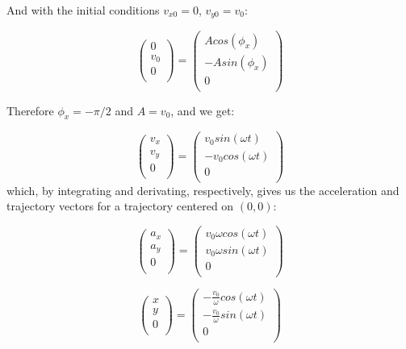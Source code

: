 \documentclass[a4paper,12pt,twoside]{article}
\begin{document}
And with the initial conditions $v_{x0}=0$, $v_{y0}=v_0$:

\begin{equation*}
	\begin{pmatrix} 0\\ v_0\\ 0\\ \end{pmatrix} = \begin{pmatrix} Acos(\phi_x)\\ -Asin(\phi_x)\\ 0\\ \end{pmatrix}
\end{equation*}

Therefore $\phi_x = -\pi /2$ and $A=v_0$, and we get:

\begin{equation*}
	\begin{pmatrix} v_x\\ v_y\\ 0\\ \end{pmatrix} = \begin{pmatrix} v_0 sin(\omega t)\\ -v_0 cos(\omega t)\\ 0\\ \end{pmatrix}
\end{equation*}
which, by integrating and derivating, respectively, gives us the acceleration and trajectory vectors for a trajectory centered on $(0,0)$:

\begin{equation*}
	\begin{pmatrix} a_x\\ a_y\\ 0\\ \end{pmatrix} = \begin{pmatrix} v_0 \omega cos(\omega t)\\ v_0 \omega sin(\omega t)\\ 0\\ \end{pmatrix}
\end{equation*}

\begin{equation*}
	\begin{pmatrix} x\\ y\\ 0\\ \end{pmatrix} = \begin{pmatrix} -\frac{v_0}{\omega} cos(\omega t)\\ -\frac{v_0}{\omega} sin(\omega t)\\ 0\\ \end{pmatrix}
\end{equation*}
\end{document}
